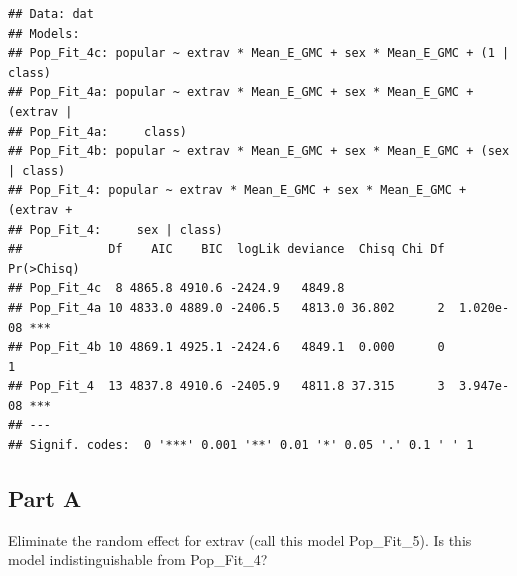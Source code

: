 \documentclass[]{article}
\begin{document}
\begin{verbatim}
## Data: dat
## Models:
## Pop_Fit_4c: popular ~ extrav * Mean_E_GMC + sex * Mean_E_GMC + (1 | class)
## Pop_Fit_4a: popular ~ extrav * Mean_E_GMC + sex * Mean_E_GMC + (extrav | 
## Pop_Fit_4a:     class)
## Pop_Fit_4b: popular ~ extrav * Mean_E_GMC + sex * Mean_E_GMC + (sex | class)
## Pop_Fit_4: popular ~ extrav * Mean_E_GMC + sex * Mean_E_GMC + (extrav + 
## Pop_Fit_4:     sex | class)
##            Df    AIC    BIC  logLik deviance  Chisq Chi Df Pr(>Chisq)    
## Pop_Fit_4c  8 4865.8 4910.6 -2424.9   4849.8                             
## Pop_Fit_4a 10 4833.0 4889.0 -2406.5   4813.0 36.802      2  1.020e-08 ***
## Pop_Fit_4b 10 4869.1 4925.1 -2424.6   4849.1  0.000      0          1    
## Pop_Fit_4  13 4837.8 4910.6 -2405.9   4811.8 37.315      3  3.947e-08 ***
## ---
## Signif. codes:  0 '***' 0.001 '**' 0.01 '*' 0.05 '.' 0.1 ' ' 1
\end{verbatim}

\subsection{Part A}\label{part-a-3}

Eliminate the random effect for extrav (call this model Pop\_Fit\_5). Is
this model indistinguishable from Pop\_Fit\_4?
\end{document}
